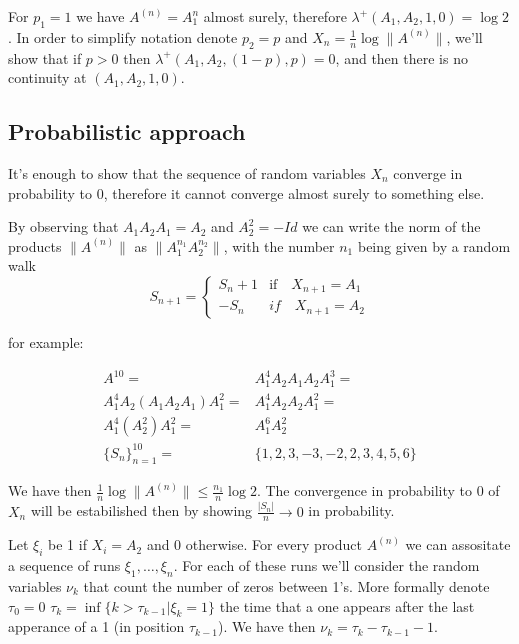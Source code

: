 \documentclass{article}
\begin{document}
For $p_1=1$ we have $A^{(n)}=A_1^n$ almost surely, therefore 
$\lambda^+(A_1,A_2,1,0)=\log 2$. In order to simplify notation denote $p_2=p$ and $X_n=\frac{1}{n}\log \|A^{(n)}\|$, we'll show that if $p>0$
then $\lambda^+(A_1,A_2,(1-p),p)=0$, and then there is no continuity at 
$(A_1,A_2,1,0)$.


\subsection{Probabilistic approach}

It's enough to show that the sequence of random variables $X_n$
converge in probability to 0, therefore it cannot converge almost surely to something
else.

By observing that  $A_1 A_2 A_1= A_2$ and $A_2^2=-Id$ we can write the norm of the products 
$\|A^{(n)}\|$ as  $\|A_1^{n_1}A_2^{n_2}\|$, with the number  $n_1$ being 
given by a random walk
\[
S_{n+1}=\begin{cases}
    S_n+ 1 & \text{if}\quad X_{n+1}=A_1 \\
    -S_n & \text{}if\quad X_{n+1}=A_2
\end{cases}
\]













for example:

\begin{align}
    A^{10}=& A_1^4 A_2 A_1 A_2 A_1^3=  \label{product}\\
    A_1^4 A_2 (A_1 A_2 A_1) A_1^2=& A_1^4 A_2 A_2 A_1^2=\\
    A_1^4 (A_2^2) A_1^2=& A_1^6 A_2^2  \\
    \{S_n\}_{n=1}^{10}=&\{1,2,3,-3,-2,2,3,4,5,6\}
\end{align}





We have then $\frac{1}{n}\log\|A^{(n)}\|\leq \frac{n_1}{n}\log 2$.
The convergence in probability to 0
of $X_n$ will be estabilished then by showing
$\frac{|S_n|}{n}\to 0$ in  probability.

Let $\xi_i $ be 1 if $X_i=A_2$ and 0 otherwise. For every product 
$A^{(n)}$ we can assositate a sequence of runs $\xi_1,\ldots, \xi_n$. 
For each of these runs we'll consider the random variables $\nu_k$ that 
count the number of zeros between 1's. More formally denote $\tau_0=0$ 
$\tau_k=\inf\{k>\tau_{k-1}| \xi_k=1\}$ the time that a one appears after
the last apperance of a 1 (in position $\tau_{k-1}$). We have then 
$\nu_k=\tau_k-\tau_{k-1}-1$.
\end{document}
